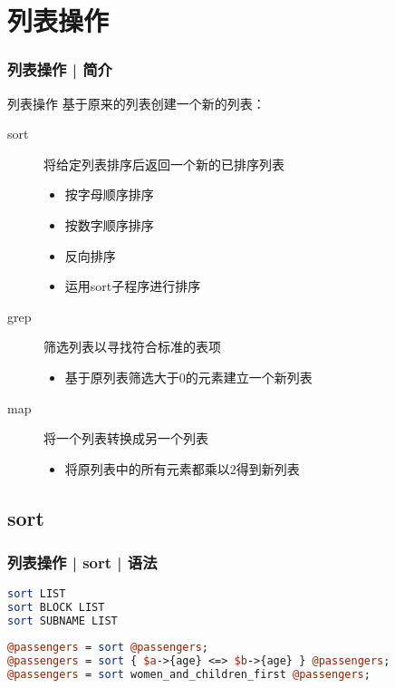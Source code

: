 \section{列表操作}
\begin{frame}
  \frametitle{列表操作 | 简介}
  \begin{block}{\alert{列表操作}}
    基于原来的列表创建一个新的列表：
    \begin{description}
      \item[sort] 将给定列表排序后返回一个新的已排序列表
        \begin{itemize}
          \item 按字母顺序排序 
          \item 按数字顺序排序
          \item 反向排序
          \item 运用sort子程序进行排序
        \end{itemize}
      \item[grep] 筛选列表以寻找符合标准的表项
        \begin{itemize}
          \item 基于原列表筛选大于0的元素建立一个新列表
        \end{itemize}
      \item[map] 将一个列表转换成另一个列表
        \begin{itemize}
          \item 将原列表中的所有元素都乘以2得到新列表
        \end{itemize}
    \end{description}
  \end{block}
\end{frame}

\subsection{sort}
\begin{frame}[fragile]
  \frametitle{列表操作 | sort | \alert{语法}}
\begin{lstlisting}[language=Perl]
sort LIST
sort BLOCK LIST
sort SUBNAME LIST
\end{lstlisting}
  \pause
\begin{lstlisting}[language=Perl]
@passengers = sort @passengers;
@passengers = sort { $a->{age} <=> $b->{age} } @passengers;
@passengers = sort women_and_children_first @passengers;
\end{lstlisting}
\end{frame}

